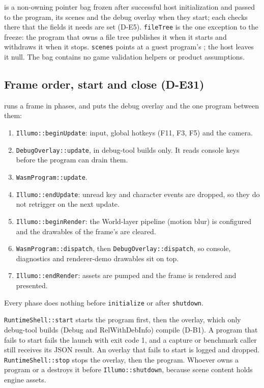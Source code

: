 is a non-owning pointer bag frozen after successful
host initialization and passed to the program, its scenes and the debug
overlay when they start; each checks there that the fields it needs are set
(D-E5). \texttt{fileTree} is the one exception to the freeze: the program that
owns a file tree publishes it when it starts and withdraws it when it stops.
\texttt{scenes} points at a guest program's ; the
host leaves it null. The bag contains no game validation helpers or product
assumptions.

\subsection{Frame order, start and close (D-E31)}
 runs a frame in phases, and  puts
the debug overlay and the one program between them:
\begin{enumerate}
  \item \texttt{Illumo::beginUpdate}: input, global hotkeys (F11, F3, F5) and
        the camera.
  \item \texttt{DebugOverlay::update}, in debug-tool builds only. It reads
        console keys before the program can drain them.
  \item \texttt{WasmProgram::update}.
  \item \texttt{Illumo::endUpdate}: unread key and character events are
        dropped, so they do not retrigger on the next update.
  \item \texttt{Illumo::beginRender}: the World-layer pipeline (motion blur)
        is configured and the drawables of the frame's 
        are cleared.
  \item \texttt{WasmProgram::dispatch}, then \texttt{DebugOverlay::dispatch},
        so console, diagnostics and renderer-demo drawables sit on top.
  \item \texttt{Illumo::endRender}: assets are pumped and the frame is
        rendered and presented.
\end{enumerate}
Every phase does nothing before \texttt{initialize} or after
\texttt{shutdown}.

\texttt{RuntimeShell::start} starts the program first, then the overlay, which
only debug-tool builds (Debug and RelWithDebInfo) compile (D-B1). A program
that fails to start fails the launch with exit code 1, and a capture or
benchmark caller still receives its JSON result. An overlay that fails to
start is logged and dropped. \texttt{RuntimeShell::stop} stops the overlay,
then the program. Whoever owns a program or a 
destroys it before \texttt{Illumo::shutdown}, because scene content holds
engine assets.

